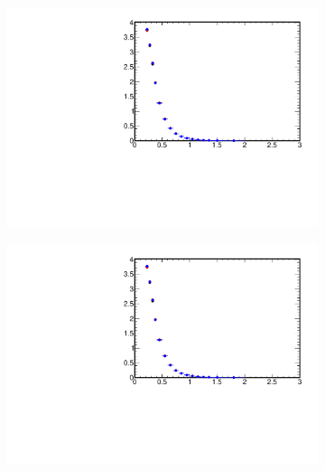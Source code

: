\begin{figure}[h!]
	\centering
	\vspace{-2.5cm}
	\begin{subfigure}{.49\textwidth}
		\includegraphics[width=\textwidth,page=6]{chapters/chrgSTAR/img/syst/out_chargedmax.pdf}
	\end{subfigure}
	\begin{subfigure}{.49\textwidth}
		\includegraphics[width=\textwidth,page=13]{chapters/chrgSTAR/img/syst/out_chargedmax.pdf}
	\end{subfigure}
	\begin{subfigure}{.49\textwidth}

\end{subfigure}
\end{figure}
